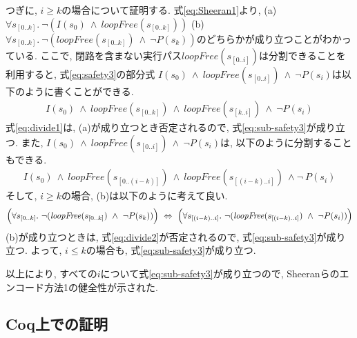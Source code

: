 \documentclass{jsarticle}
\begin{document}
つぎに, $i \geq k$の場合について証明する.
式\eqref{eq:Sheeran1}より, (a) $\forall s_{[0..k]}. \ \neg(I(s_0) \ \wedge \ \mathit{loopFree}(s_{[0..k]}))$ 
(b) $\forall s_{[0..k]}. \ \neg (\mathit{loopFree}(s_{[0..k]}) \ \wedge \ \neg P(s_k))$のどちらかが成り立つことがわかっている.
ここで, 閉路を含まない実行パス$\mathit{loopFree}(s_{[0..i]})$は分割できることを利用すると, 
式\eqref{eq:safety3}の部分式 $I(s_0) \ \wedge \ \mathit{loopFree}(s_{[0..i]})\ \wedge \ \neg P(s_i)$は以下のように書くことができる.
\begin{align}
 \label{eq:divide1}
  I(s_0) \  \wedge \ \mathit{loopFree}(s_{[0..k]}) \ \wedge \ \mathit{loopFree}(s_{[k..i]}) \ \wedge \ \neg P(s_i)
 \end{align}
式\eqref{eq:divide1}は, (a)が成り立つとき否定されるので, 式\eqref{eq:sub-safety3}が成り立つ.
また, $I(s_0) \ \wedge \ \mathit{loopFree}(s_{[0..i]})\ \wedge \ \neg P(s_i)$は, 以下のように分割することもできる.
\begin{align}
 \label{eq:divide2}
  I(s_0) \  \wedge \ \mathit{loopFree}(s_{[0..(i-k)]}) \ \wedge \ \mathit{loopFree}(s_{[(i-k)..i]}) \ \wedge \neg \ P(s_i)
 \end{align}
 そして, $i \geq k$の場合, (b)は以下のように考えて良い.
 \begin{align}
 \label{eq:shift-state}
 \Bigl(\forall s_{[0..k]}. \ \neg (\mathit{loopFree}(s_{[0..k]}) \ \wedge \ \neg P(s_k))\Bigr) \ \Leftrightarrow \
 \Bigl(\forall s_{[(i-k)..i]}. \ \neg (\mathit{loopFree}(s_{[(i-k)..i]}) \ \wedge \ \neg P(s_i))\Bigr)
 \end{align}
(b)が成り立つときは, 式\eqref{eq:divide2}が否定されるので, 式\eqref{eq:sub-safety3}が成り立つ.
よって, $i \leq k$の場合も, 式\eqref{eq:sub-safety3}が成り立つ.


以上により, すべての$i$について式\eqref{eq:sub-safety3}が成り立つので, Sheeranらのエンコード方法1の健全性が示された.

\subsection{Coq上での証明}
\end{document}

